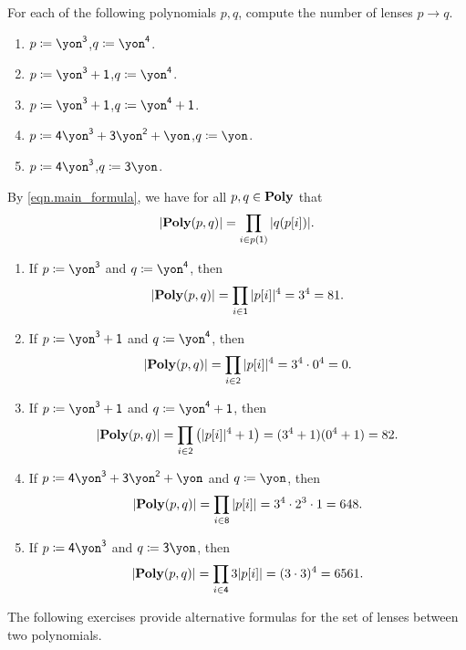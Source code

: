 \documentclass[Book-Poly]{subfiles}
\begin{document}
\begin{exercise}
For each of the following polynomials $p,q$, compute the number of lenses $p\to q$.
\begin{enumerate}
	\item $p\coloneqq\yon^\3$,\quad $q\coloneqq\yon^\4$.
	\item $p\coloneqq\yon^\3+\1$,\quad $q\coloneqq\yon^\4$.
	\item $p\coloneqq\yon^\3+\1$,\quad $q\coloneqq\yon^\4+\1$.
	\item $p\coloneqq\4\yon^\3+\3\yon^\2+\yon$,\quad $q\coloneqq\yon$.
	\item $p\coloneqq\4\yon^\3$,\quad $q\coloneqq\3\yon$.
\qedhere
\end{enumerate}
\begin{solution}
By \eqref{eqn.main_formula}, we have for all $p,q\in\mathbf{Poly}$ that
\[
    |\mathbf{Poly}(p,q)| = \prod_{i\in p(\textsf{1})}|q(p[i])|.
\]
\begin{enumerate}
	\item If $p\coloneqq\yon^\3$ and $q\coloneqq\yon^\4$, then
	\[
	    |\mathbf{Poly}(p,q)| = \prod_{i\in\textsf{1}}|p[i]|^4 = 3^4 = 81.
	\]
	\item If $p\coloneqq\yon^\3+\1$ and $q\coloneqq\yon^\4$, then
	\[
	    |\mathbf{Poly}(p,q)| = \prod_{i\in\textsf{2}}|p[i]|^4 = 3^4\cdot0^4 = 0.
	\]
	\item If $p\coloneqq\yon^\3+\1$ and $q\coloneqq\yon^\4+\1$, then
	\[
	    |\mathbf{Poly}(p,q)| = \prod_{i\in\textsf{2}}\left(|p[i]|^4+1\right) = (3^4 + 1)(0^4 + 1) = 82.
	\]
	\item If $p\coloneqq\4\yon^\3+\3\yon^\2+\yon$ and $q\coloneqq\yon$, then
	\[
	    |\mathbf{Poly}(p,q)| = \prod_{i\in\textsf{8}}|p[i]| = 3^4\cdot2^3\cdot1 = 648.
	\]
	\item If $p\coloneqq\4\yon^\3$ and $q\coloneqq\3\yon$, then
	\[
	    |\mathbf{Poly}(p,q)| = \prod_{i\in\textsf{4}}3|p[i]| = (3\cdot3)^4 = 6561.
	\]
\qedhere
\end{enumerate}
\end{solution}
\end{exercise}

The following exercises provide alternative formulas for the set of lenses between two polynomials.
\end{document}
